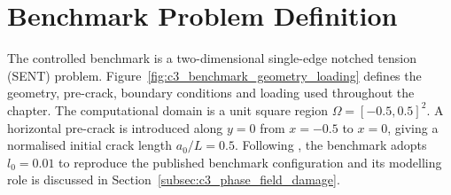 







\section{Benchmark Problem Definition}
\label{sec:c3_benchmark_definition}

The controlled benchmark is a two-dimensional single-edge notched tension (SENT) problem. Figure~\ref{fig:c3_benchmark_geometry_loading} defines the geometry, pre-crack, boundary conditions and loading used throughout the chapter. The computational domain is a unit square region $\Omega=[-0.5,0.5]^2$. A horizontal pre-crack is introduced along $y=0$ from $x=-0.5$ to $x=0$, giving a normalised initial crack length \(a_0/L=0.5\). Following \cite{Manav2024cmame}, the benchmark adopts $l_0=0.01$ to reproduce the published benchmark configuration and its modelling role is discussed in Section~\ref{subsec:c3_phase_field_damage}.

